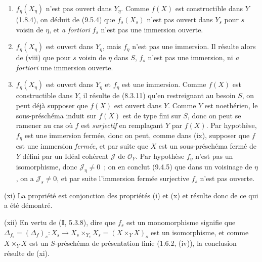 \begin{enumerate}[label=\upshape{$\arabic{enumi}^\circ$}]
  \item $f_\eta(X_\eta)$ n'est pas ouvert dans $Y_\eta$. Comme $f(X)$ est
  constructible dans $Y$ (1.8.4), on déduit de (9.5.4) que $f_s(X_s)$ n'est
  pas ouvert dans $Y_s$ pour $s$ voisin de $\eta$, et \emph{a fortiori} $f_s$
  n'est pas une immersion ouverte.

  \item $f_\eta(X_\eta)$ est ouvert dans $Y_\eta$, mais $f_\eta$ n'est pas une
  immersion. Il résulte alors de (viii) que pour $s$ voisin de $\eta$ dans $S$,
  $f_s$ n'est pas une immersion, ni \emph{a fortiori} une immersion ouverte.

  \item $f_\eta(X_\eta)$ est ouvert dans $Y_\eta$ et $f_\eta$ est une
  immersion. Comme $f(X)$ est constructible dans $Y$, il résulte de (8.3.11)
  qu'en restreignant au besoin $S$, on peut déjà supposer que $f(X)$ est ouvert
  dans $Y$. Comme $Y$ est noethérien, le sous-préschéma induit sur $f(X)$ est
  de type fini sur $S$, donc on peut se ramener au cas où $f$ est \emph{surjectif}
  en remplaçant $Y$ par $f(X)$. Par hypothèse, $f_\eta$ est une immersion
  fermée, donc on peut, comme dans (ix), supposer que $f$ est une immersion
  \emph{fermée}, et par suite que $X$ est un sous-préschéma fermé de $Y$ défini
  par un Idéal cohérent $\mathcal J$ de $\mathcal O_Y$. Par hypothèse
  $f_\eta$ n'est pas un isomorphisme, donc $\mathcal J_\eta\neq0$~; on en
  conclut (9.4.5) que dans un voisinage de $\eta$, on a $\mathcal J_s\neq0$,
  et par suite l'immersion fermée surjective $f_s$ n'est pas ouverte.
\end{enumerate}

(xi) La propriété est conjonction des propriétés (i) et (x) et résulte donc de
ce qui a été démontré.

(xii) En vertu de (\textbf{I}, 5.3.8), dire que $f_s$ est un monomorphisme
signifie que
$\Delta_{f_s}=(\Delta_f)_s:X_s\to X_s\times_{Y_s}X_s=(X\times_YX)_s$ est un
isomorphisme, et comme $X\times_YX$ est un $S$-préschéma de présentation finie
(1.6.2, (iv)), la conclusion résulte de (xi).

